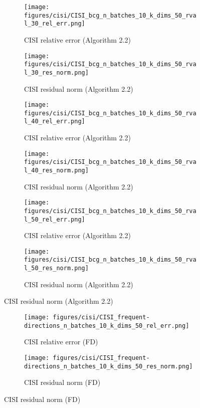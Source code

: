 \begin{figure}\ContinuedFloat
  \begin{subfigure}[b]{0.48\textwidth}
    \centering
    \texttt{[image: figures/cisi/CISI\_bcg\_n\_batches\_10\_k\_dims\_50\_rval\_30\_rel\_err.png]}
    \caption{CISI relative error (Algorithm 2.2)}
  \end{subfigure}
  \hfill
  \begin{subfigure}[b]{0.48\textwidth}
    \centering
    \texttt{[image: figures/cisi/CISI\_bcg\_n\_batches\_10\_k\_dims\_50\_rval\_30\_res\_norm.png]}
    \caption{CISI residual norm (Algorithm 2.2)}
  \end{subfigure}
    \begin{subfigure}[b]{0.48\textwidth}
    \centering
    \texttt{[image: figures/cisi/CISI\_bcg\_n\_batches\_10\_k\_dims\_50\_rval\_40\_rel\_err.png]}
    \caption{CISI relative error (Algorithm 2.2)}
  \end{subfigure}
  \hfill
  \begin{subfigure}[b]{0.48\textwidth}
    \centering
    \texttt{[image: figures/cisi/CISI\_bcg\_n\_batches\_10\_k\_dims\_50\_rval\_40\_res\_norm.png]}
    \caption{CISI residual norm (Algorithm 2.2)}
  \end{subfigure}
    \begin{subfigure}[b]{0.48\textwidth}
    \centering
    \texttt{[image: figures/cisi/CISI\_bcg\_n\_batches\_10\_k\_dims\_50\_rval\_50\_rel\_err.png]}
    \caption{CISI relative error (Algorithm 2.2)}
  \end{subfigure}
  \hfill
  \begin{subfigure}[b]{0.48\textwidth}
    \centering
    \texttt{[image: figures/cisi/CISI\_bcg\_n\_batches\_10\_k\_dims\_50\_rval\_50\_res\_norm.png]}
    \caption{CISI residual norm (Algorithm 2.2)}
  \end{subfigure}
 \end{figure}
 
 \begin{figure}\ContinuedFloat
  \begin{subfigure}[b]{0.48\textwidth}
    \centering
    \texttt{[image: figures/cisi/CISI\_frequent-directions\_n\_batches\_10\_k\_dims\_50\_rel\_err.png]}
    \caption{CISI relative error (FD)}
  \end{subfigure}
  \hfill
  \begin{subfigure}[b]{0.48\textwidth}
    \centering
    \texttt{[image: figures/cisi/CISI\_frequent-directions\_n\_batches\_10\_k\_dims\_50\_res\_norm.png]}
    \caption{CISI residual norm (FD)}
  \end{subfigure}
\end{figure}